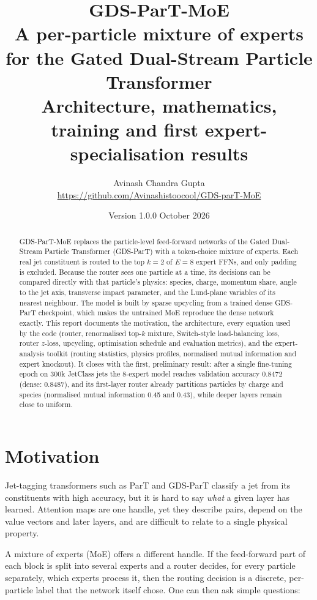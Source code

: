 \documentclass[11pt,a4paper]{article}
\title{\textbf{GDS-ParT-MoE}\\[4pt]\large A per-particle mixture of experts for the Gated
Dual-Stream Particle Transformer\\[2pt]
\normalsize Architecture, mathematics, training and first expert-specialisation results}
\author{Avinash Chandra Gupta\\\small \url{https://github.com/Avinashistoocool/GDS-parT-MoE}}
\date{Version 1.0.0 \quad October 2026}
\begin{document}
\maketitle

\begin{abstract}
GDS-ParT-MoE replaces the particle-level feed-forward networks of the Gated Dual-Stream
Particle Transformer (GDS-ParT) with a token-choice mixture of experts. Each real jet
constituent is routed to the top $k=2$ of $E=8$ expert FFNs, and only padding is excluded.
Because the router sees one particle at a time, its decisions can be compared directly with
that particle's physics: species, charge, momentum share, angle to the jet axis, transverse
impact parameter, and the Lund-plane variables of its nearest neighbour. The model is built
by sparse upcycling from a trained dense GDS-ParT checkpoint, which makes the untrained MoE
reproduce the dense network exactly. This report documents the motivation, the architecture,
every equation used by the code (router, renormalised top-$k$ mixture, Switch-style
load-balancing loss, router $z$-loss, upcycling, optimisation schedule and evaluation
metrics), and the expert-analysis toolkit (routing statistics, physics profiles, normalised
mutual information and expert knockout). It closes with the first, preliminary result: after a
single fine-tuning epoch on 300k JetClass jets the 8-expert model reaches validation accuracy
0.8472 (dense: 0.8487), and its first-layer router already partitions particles by charge and
species (normalised mutual information 0.45 and 0.43), while deeper layers remain close to
uniform.
\end{abstract}

\tableofcontents
\newpage

\section{Motivation}

Jet-tagging transformers such as ParT and GDS-ParT classify a jet from its constituents with
high accuracy, but it is hard to say \emph{what} a given layer has learned. Attention maps
are one handle, yet they describe pairs, depend on the value vectors and later layers, and
are difficult to relate to a single physical property.

A mixture of experts (MoE) offers a different handle. If the feed-forward part of each block
is split into several experts and a router decides, for every particle separately, which
experts process it, then the routing decision is a discrete, per-particle label that the
network itself chose. One can then ask simple questions:
\end{document}
